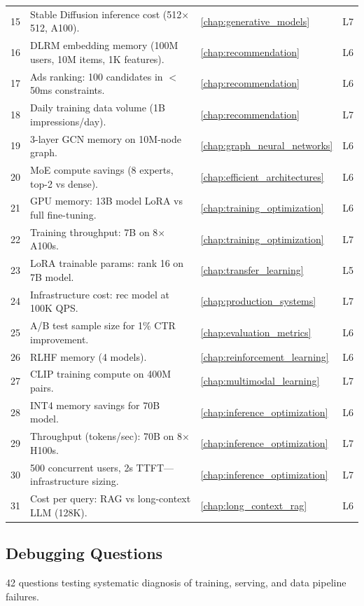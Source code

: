 \begin{longtable}{rp{8.5cm}ll}
15 & Stable Diffusion inference cost (512$\times$512, A100). & \ref{chap:generative_models} & L7 \\
16 & DLRM embedding memory (100M users, 10M items, 1K features). & \ref{chap:recommendation} & L6 \\
17 & Ads ranking: 100 candidates in $<$50ms constraints. & \ref{chap:recommendation} & L6 \\
18 & Daily training data volume (1B impressions/day). & \ref{chap:recommendation} & L7 \\
19 & 3-layer GCN memory on 10M-node graph. & \ref{chap:graph_neural_networks} & L6 \\
20 & MoE compute savings (8 experts, top-2 vs dense). & \ref{chap:efficient_architectures} & L6 \\
21 & GPU memory: 13B model LoRA vs full fine-tuning. & \ref{chap:training_optimization} & L6 \\
22 & Training throughput: 7B on 8$\times$A100s. & \ref{chap:training_optimization} & L7 \\
23 & LoRA trainable params: rank 16 on 7B model. & \ref{chap:transfer_learning} & L5 \\
24 & Infrastructure cost: rec model at 100K QPS. & \ref{chap:production_systems} & L7 \\
25 & A/B test sample size for 1\% CTR improvement. & \ref{chap:evaluation_metrics} & L6 \\
26 & RLHF memory (4 models). & \ref{chap:reinforcement_learning} & L6 \\
27 & CLIP training compute on 400M pairs. & \ref{chap:multimodal_learning} & L7 \\
28 & INT4 memory savings for 70B model. & \ref{chap:inference_optimization} & L6 \\
29 & Throughput (tokens/sec): 70B on 8$\times$H100s. & \ref{chap:inference_optimization} & L7 \\
30 & 500 concurrent users, 2s TTFT---infrastructure sizing. & \ref{chap:inference_optimization} & L7 \\
31 & Cost per query: RAG vs long-context LLM (128K). & \ref{chap:long_context_rag} & L6 \\
\end{longtable}

\subsection{Debugging Questions}

42 questions testing systematic diagnosis of training, serving, and data pipeline failures.

